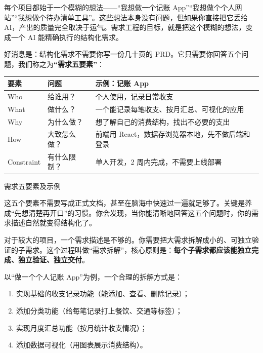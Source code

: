 


每个项目都始于一个模糊的想法——“我想做一个记账 App”“我想做个个人网站”“我想做个待办清单工具”。这些想法本身没有问题，但如果你直接把它丢给 AI，产出的质量完全取决于运气。需求工程的目标，就是把这个模糊的想法，变成一个 AI 能精确执行的结构化需求。

好消息是：结构化需求不需要你写一份几十页的 PRD。它只需要你回答五个问题，我们称之为\textbf{“需求五要素”}：

\begin{center}
\begin{tabularx}{\linewidth}{|X|X|X|}
\hline
\textbf{要素} & \textbf{问题} & \textbf{示例：记账 App} \tabularnewline
\hline
Who & 给谁用？ & 个人使用，记录日常收支 \tabularnewline
What & 做什么？ & 一个能记录每笔收支、按月汇总、可视化的应用 \tabularnewline
Why & 为什么做？ & 想了解自己的消费结构，找出不必要的支出 \tabularnewline
How & 大致怎么做？ & 前端用 React，数据存浏览器本地，先不做后端和登录 \tabularnewline
Constraint & 有什么限制？ & 单人开发，2 周内完成，不需要上线部署 \tabularnewline
\hline
\end{tabularx}
\end{center}

\begin{center}\small\color{gray}需求五要素及示例\end{center}

这五个要素不需要写成正式文档，甚至在脑海中快速过一遍就足够了。关键是养成“先想清楚再开口”的习惯。你会发现，当你能清晰地回答这五个问题时，你的需求描述自然就变得结构化了。


对于较大的项目，一个需求描述是不够的。你需要把大需求拆解成小的、可独立验证的子需求。这个过程叫做“需求拆解”，核心原则是：\textbf{每个子需求都应该能独立完成、独立验证、独立交付}。

以“做一个个人记账 App”为例，一个合理的拆解方式是：

\begin{enumerate}
  \item 实现基础的收支记录功能（能添加、查看、删除记录）；
  \item 添加分类功能（给每笔记录打上餐饮、交通等标签）；
  \item 实现月度汇总功能（按月统计收支情况）；
  \item 添加数据可视化（用图表展示消费结构）。
\end{enumerate}

